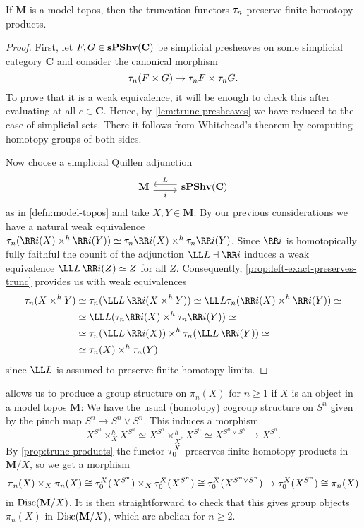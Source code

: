\begin{proposition}\label{prop:trunc-products}
  If \(\mathbf M\) is a model topos, then the truncation functors \(\tau_{n}\) preserve finite homotopy products.
\end{proposition}
\begin{proof}
  First, let \(F,G\in\operatorname{\textnormal{\bfseries sPShv}}(\mathbf C)\) be simplicial presheaves on some simplicial category \(\mathbf C\) and consider the canonical morphism
  \[\tau_{n}(F\times G)\to \tau_{n}F\times\tau_{n}G.\]
  To prove that it is a weak equivalence, it will be enough to check this after evaluating at all \(c\in\mathbf C\). Hence, by \autoref{lem:trunc-presheaves} we have reduced to the case of simplicial sets. There it follows from Whitehead's theorem by computing homotopy groups of both sides.

  Now choose a simplicial Quillen adjunction
  \[
  \begin{tikzcd}
    \mathbf M \arrow[r, shift right=.7ex, "i"'] & \arrow[l, shift right=.7ex, "L"'] \spshv(\mathbf C)
  \end{tikzcd}
  \]
  as in \autoref{defn:model-topos} and take \(X, Y\in\mathbf M\). By our previous considerations we have a natural weak equivalence \(\trunc{n}(\RR i(X)\times^{h}\RR i(Y))\simeq \trunc{n}\RR i(X)\times^{h}\trunc{n}\RR i(Y)\). Since \(\RR i\) is homotopically fully faithful the counit of the adjunction \(\LL L\dashv \RR i\) induces a weak equivalence \(\LL L\,\RR i (Z)\simeq Z\) for all \(Z\). Consequently, \autoref{prop:left-exact-preserves-trunc} provides us with weak equivalences
  \begin{align*}
    \trunc{n}(X\times^{h} Y) &\simeq \trunc{n}(\LL L\,\RR i(X\times^{h} Y)) \simeq \LL L\trunc{n}(\RR i(X)\times^{h} \RR i(Y)) \simeq \\
                         &\simeq \LL L(\trunc{n}\RR i(X)\times^{h} \trunc{n}\RR i(Y)) \simeq \\
                         &\simeq \trunc{n}(\LL L\,\RR i(X)) \times^{h} \trunc{n}(\LL L\,\RR i(Y)) \simeq \\
                         &\simeq \trunc{n}(X) \times^{h} \trunc{n}(Y)
  \end{align*}
  since \(\LL L\) is assumed to preserve finite homotopy limits.
\end{proof}

 allows us to produce a group structure on \(\pi_{n}(X)\) for \(n\geq 1\) if \(X\) is an object in a model topos \(\mathbf M\): We have the usual (homotopy) cogroup structure on \(S^{n}\) given by the pinch map \(S^{n}\to S^{n}\vee S^{n}\). This induces a morphism
\[ X^{S^{n}}\times^{h}_{X} X^{S^{n}} \simeq X^{S^{n}}\times^{h}_{X^{*}} X^{S^{n}} \simeq X^{S^{n}\vee S^{n}} \to X^{S^{n}}.\]
By \autoref{prop:trunc-products} the functor \(\tau_{0}^{X}\) preserves finite homotopy products in \(\mathbf M/X\), so we get a morphism
\[\pi_{n}(X)\times_{X}\pi_{n}(X)\cong \tau_{0}^{X}(X^{S^{n}})\times_{X}\tau_{0}^{X}(X^{S^{n}})\cong \tau_{0}^{X}(X^{S^{n}\vee S^{n}}) \to \tau_{0}^{X}(X^{S^{n}}) \cong \pi_{n}(X)\]
in \(\operatorname{\textnormal{Disc}}(\mathbf M/X)\). It is then straightforward to check that this gives group objects \(\pi_{n}(X)\) in \(\operatorname{\textnormal{Disc}}(\mathbf M/X)\), which are abelian for \(n\geq 2\).

